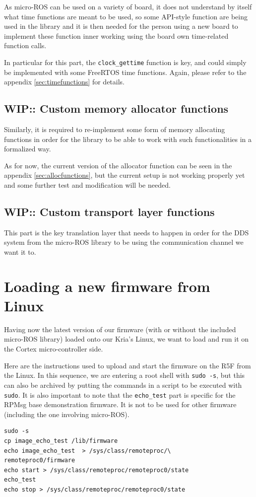 \documentclass[10pt]{article}
\begin{document}
As micro-ROS can be used on a variety of board, it does not understand by itself
what time functions are meant to be used, so some API-style function are being
used in the library and it is then needed for the person using a new board
to implement these function inner working using the board own time-related
function calls.

In particular for this part, the \verb|clock_gettime| function is key, and could
simply be implemented with some FreeRTOS time functions.
Again, please refer to the appendix \ref{sec:timefunctions} for details.

\subsection{WIP:: Custom memory allocator functions}
Similarly, it is required to re-implement some form of memory allocating
functions in order for the library to be able to work with such functionalities
in a formalized way.

As for now, the current version of the allocator function can be seen in the
appendix \ref{sec:allocfunctions}, but the current setup is not working
properly yet and some further test and modification will be needed.

\subsection{WIP:: Custom transport layer functions}
This part is the key translation layer that needs to happen in order for the
DDS system from the micro-ROS library to be using the communication channel we
want it to.





\section{Loading a new firmware from Linux}
Having now the latest version of our firmware (with or without the included
micro-ROS library) loaded onto our Kria's Linux, we want to load and run it
on the Cortex micro-controller side.

Here are the instructions used to upload and start the firmware
on the R5F from the Linux.
In this sequence, we are entering a root shell with \verb|sudo -s|, but this can
also be archived by putting the commands in a script to be executed with \verb|sudo|.
It is also important to note that the \verb|echo_test| part is specific for the
RPMsg base demonstration firmware. It is not to be used for other firmware
(including the one involving micro-ROS).
\begin{tcolorbox}
\begin{verbatim}
sudo -s
cp image_echo_test /lib/firmware
echo image_echo_test  > /sys/class/remoteproc/\
remoteproc0/firmware
echo start > /sys/class/remoteproc/remoteproc0/state
echo_test
echo stop > /sys/class/remoteproc/remoteproc0/state
\end{verbatim}
\end{tcolorbox}
\end{document}
